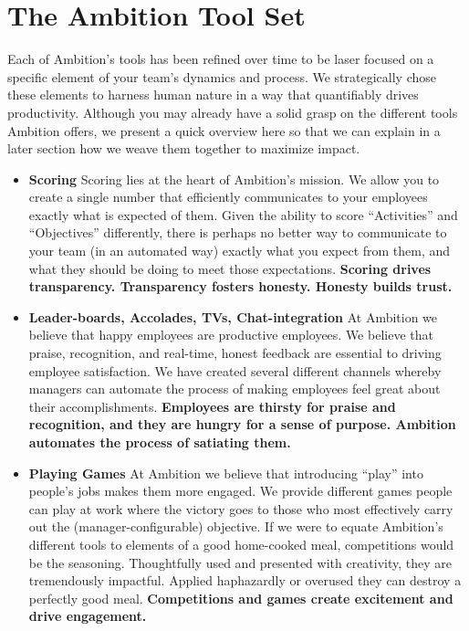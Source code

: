 \documentclass[paper=a4, fontsize=11pt abstract]{scrartcl}
\numberwithin{equation}{section}		%
\numberwithin{figure}{section}			%
\numberwithin{table}{section}				%
\begin{document}
\section{The Ambition Tool Set}
Each of Ambition's tools has been refined over time to be laser focused on a specific element of your team's dynamics and process.  We strategically chose these elements to harness human nature in a way that quantifiably drives productivity.  Although you may already have a solid grasp on the different tools Ambition offers, we present a quick overview here so that we can explain in a later section how we weave them together to maximize impact.
\begin{itemize}
    \item \textbf{Scoring} Scoring lies at the heart of Ambition's mission.  We allow you to create a single number that efficiently communicates to your employees exactly what is expected of them.  Given the ability to score ``Activities'' and ``Objectives'' differently, there is perhaps no better way to communicate to your team (in an automated way) exactly what you expect from them, and what they should be doing to meet those expectations.  \textbf{Scoring drives transparency. Transparency fosters honesty.  Honesty builds trust.}
    
    \item \textbf{Leader-boards, Accolades, TVs, Chat-integration} At Ambition we believe that happy employees are productive employees.  We believe that praise, recognition, and real-time, honest feedback are essential to driving employee satisfaction.  We have created several different channels whereby managers can automate the process of making employees feel great about their accomplishments. \textbf{Employees are thirsty for praise and recognition, and they are hungry for a sense of purpose.  Ambition automates the process of satiating them.}
    
    \item \textbf{Playing Games} At Ambition we believe that introducing ``play'' into people's jobs makes them more engaged.  We provide different games people can play at work where the victory goes to those who most effectively carry out the (manager-configurable) objective.  If we were to equate Ambition's different tools to elements of a good home-cooked meal, competitions would be the seasoning.  Thoughtfully used and presented with creativity, they are tremendously impactful. Applied haphazardly or overused they can destroy a perfectly good meal. \textbf{Competitions and games create excitement and drive engagement.}
    

\end{itemize}
\end{document}
